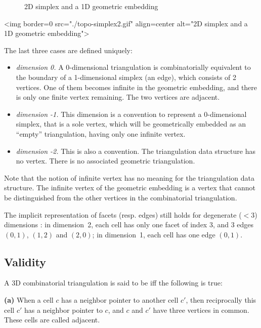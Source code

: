 \begin{itemize}
\begin{ccTexOnly}
\begin{figure}
\begin{center}
\end{center}
\caption{2D simplex and a 1D geometric embedding \label{TDS3-fig-topo-simplex2}}
\end{figure} 
\end{ccTexOnly}
\begin{ccHtmlOnly}
<img border=0 src="./topo-simplex2.gif" align=center
alt="2D simplex and a 1D geometric embedding">
\end{ccHtmlOnly}
\end{itemize}

The last three cases are defined uniquely:
\begin{itemize}
\item \emph{dimension 0.} A 0-dimensional triangulation is
combinatorially equivalent to the boundary of a 1-dimensional simplex
(an edge), which consists of 2 vertices. One of them becomes infinite
in the geometric embedding, and there is only one finite vertex
remaining. The two vertices are adjacent.
\item \emph{dimension -1.} This dimension is a convention to represent a 
0-dimensional simplex, that is a sole vertex, which will be
geometrically embedded as an ``empty'' triangulation, having only one
infinite vertex.
\item \emph{dimension -2.} This is also a convention. The
triangulation data structure has no vertex. There is no associated
geometric triangulation.
\end{itemize} 

Note that the notion of infinite vertex has no meaning for the
triangulation data structure. The infinite vertex of the geometric
embedding is a vertex that cannot be distinguished from the other
vertices in the combinatorial triangulation.

The implicit representation of facets (resp. edges) still holds
for degenerate ($< 3$) dimensions : in dimension~2, each cell has only one
facet of index 3, and 3 edges $(0,1)$, $(1,2)$ and $(2,0)$; in
dimension~1, each cell has one edge $(0,1)$. 

\subsection{Validity}
\label{TDS3-sec-Valid}
A 3D combinatorial triangulation is said to be  
iff the following is true:

{\bf (a)} When a cell $c$ has a neighbor pointer to another cell $c'$,
then reciprocally this cell $c'$ has a neighbor pointer to $c$, and
$c$ and $c'$ have three vertices in common. These cells are called
adjacent. 

